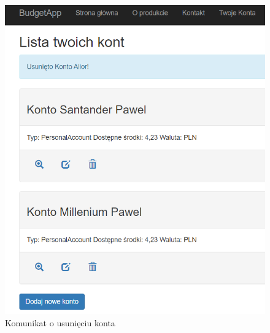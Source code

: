 \begin{figure}[ht]
	\centering
\includegraphics[scale=.35]{rys04/usunieto.PNG}
	\caption{Komunikat o usunięciu konta}
	\label{fig:ss-5}
\end{figure}
